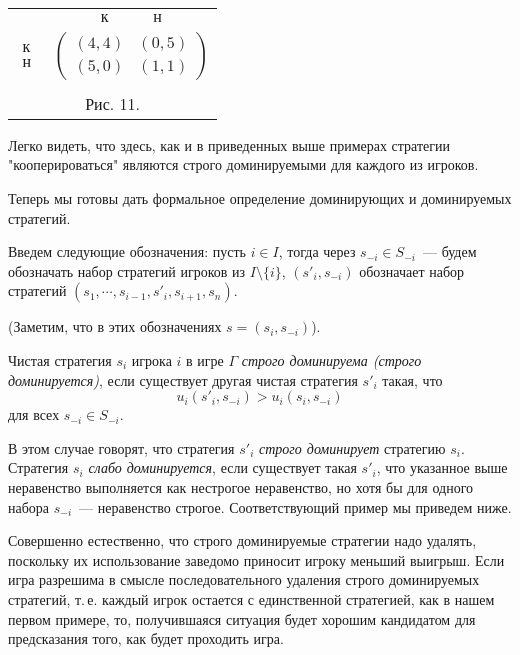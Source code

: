 \begin{center}
\begin{tabular}{cc}
&$\begin{array}{cc} к\quad& \quad н \end{array}$\\
$\begin{array}{c} к\\ н \end{array}$& $\left(\begin{array}{cc}
(4,4)&(0,5)\\
(5,0)&(1,1) \end{array}\right)$\\
\multicolumn{2}{c}{}\\
\multicolumn{2}{c}{Рис. 11.}\\
\end{tabular}
\end{center}

Легко видеть, что здесь, как и в приведенных выше примерах стратегии
"кооперироваться" являются строго доминируемыми для каждого из
игроков.

Теперь мы готовы дать формальное определение доминирующих и
доминируемых стратегий.

Введем следующие обозначения: пусть $i\in I$, тогда через $s_{-i}\in
S_{-i}$~--- будем обозначать набор стратегий игроков из
$I\setminus\{i\}$, $(s'_i,s_{-i})$ обозначает набор стратегий
$(s_1,\cdots,s_{i-1},s'_i,s_{i+1},s_n)$.

(Заметим, что в этих обозначениях $s=(s_i,s_{-i})$).


Чистая стратегия $s_i$ игрока $i$ в игре $\Gamma$ \emph{строго
доминируема (строго доминируется)}, если существует другая чистая
стратегия $s'_i$ такая, что
$$ u_i(s'_i,s_{-i})>u_i(s_i,s_{-i}) $$ для всех
$s_{-i}\in S_{-i}$.


В этом случае говорят, что стратегия $s'_i$ \emph{строго
доминирует} стратегию $s_i$.  Стратегия $s_i$ {\it слабо
доминируется}, если существует такая $s'_i$, что указанное выше
неравенство выполняется как нестрогое неравенство, но хотя бы для
одного набора $s_{-i}$~--- неравенство строгое. Соответствующий
пример мы приведем ниже.

Совершенно естественно, что строго доминируемые стратегии надо
удалять, поскольку их использование заведомо приносит игроку меньший
выигрыш. Если игра разрешима в смысле последовательного удаления
строго доминируемых стратегий, т.\,е. каждый игрок остается с
единственной стратегией, как в нашем первом примере, то,
получившаяся ситуация будет хорошим кандидатом для предсказания
того, как будет проходить игра.

